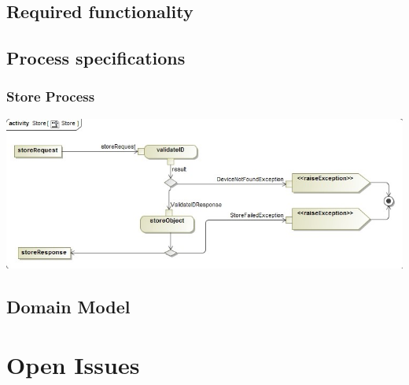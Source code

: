 \documentclass{article}
\begin{document}
\subsection{Required functionality}
\subsection{Process specifications}
\subsubsection{Store Process}
	\includegraphics[width=\textwidth]{images/Store.jpg}  \\
\subsection{Domain Model}
\section{Open Issues}
\end{document}
